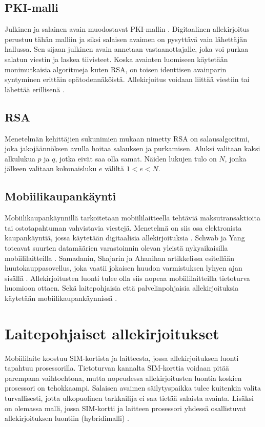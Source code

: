\documentclass[finnish]{tktltiki2}
\theoremstyle{definition}
\theoremstyle{remark}
\begin{document}
\subsection{PKI-malli}

Julkinen ja salainen avain muodostavat PKI-mallin \cite{ECC}. Digitaalinen allekirjoitus perustuu tähän malliin ja siksi salaisen avaimen on pysyttävä vain lähettäjän hallussa. Sen sijaan julkinen avain annetaan vastaanottajalle, joka voi purkaa salatun viestin ja laskea tiivisteet. Koska avainten luomiseen käytetään monimutkaisia algoritmeja kuten RSA, on toisen identtisen avainparin syntyminen erittäin epätodennäköistä. Allekirjoitus voidaan liittää viestiin tai lähettää erillisenä \cite{moen}.

\subsection{RSA}

Menetelmän kehittäjien sukunimien mukaan nimetty RSA on salausalgoritmi, joka jakojäännöksen avulla hoitaa salauksen ja purkamisen. Aluksi valitaan kaksi alkulukua $p$ ja $q$, jotka eivät saa olla samat. Näiden lukujen tulo on $N$, jonka jälkeen valitaan kokonaisluku $e$ väliltä $1 < e < N$.   

\subsection{Mobiilikaupankäynti}

Mobiilikaupankäynnillä tarkoitetaan mobiililaitteella tehtäviä maksutransaktioita tai ostotapahtuman vahvistavia viestejä. Menetelmä on siis osa elektronista kaupankäyntiä, jossa käytetään digitaalisia allekirjoituksia \cite{e-c}. Schwab ja Yang toteavat suurten datamäärien varastoinnin olevan yleistä nykyaikaisilla mobiililaitteilla \cite{enti}. Samadanin, Shajarin ja Ahanihan artikkelissa esitellään huutokauppasovellus, joka vaatii jokaisen huudon varmistuksen lyhyen ajan sisällä \cite{proxy}. Allekirjoitusten luonti tulee olla siis nopeaa mobiililaitteilla tietoturva huomioon ottaen. Sekä laitepohjaisia että palvelinpohjaisia allekirjoituksia käytetään mobiilikaupankäynnissä \cite{proxy}.

\section{Laitepohjaiset allekirjoitukset}

Mobiililaite koostuu SIM-kortista ja laitteesta, jossa allekirjoituksen luonti tapahtuu prosessorilla. Tietoturvan kannalta SIM-korttia voidaan pitää parempana vaihtoehtona, mutta nopeudessa allekirjoitusten luontia koskien prosessori on tehokkaampi. Salaisen avaimen säilytyspaikka tulee kuitenkin valita turvallisesti, jotta ulkopuolinen tarkkailija ei saa tietää salaista avainta. Lisäksi on olemassa malli, jossa SIM-kortti ja laitteen prosessori yhdessä osallistuvat allekirjoituksen luontiin (hybridimalli) \cite{proxy}.
 
\end{document}
